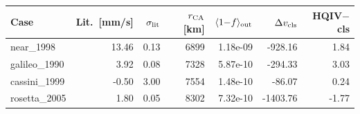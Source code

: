 \begin{tabular}{@{}lrrrrrr@{}}
\toprule
Case & Lit.\ [mm/s] & $\sigma_{\rm lit}$ & $r_{\rm CA}$ [km] & $\langle 1{-}f\rangle_{\rm out}$ & $\Delta v_{\rm cls}$ & HQIV$-$cls \\
\midrule
near\_1998 & 13.46 & 0.13 & 6899 & 1.18e-09 & -928.16 & 1.84 \\
galileo\_1990 & 3.92 & 0.08 & 7328 & 5.87e-10 & -294.33 & 3.03 \\
cassini\_1999 & -0.50 & 3.00 & 7554 & 1.48e-10 & -86.07 & 0.24 \\
rosetta\_2005 & 1.80 & 0.05 & 8302 & 7.32e-10 & -1403.76 & -1.77 \\
\bottomrule
\end{tabular}
